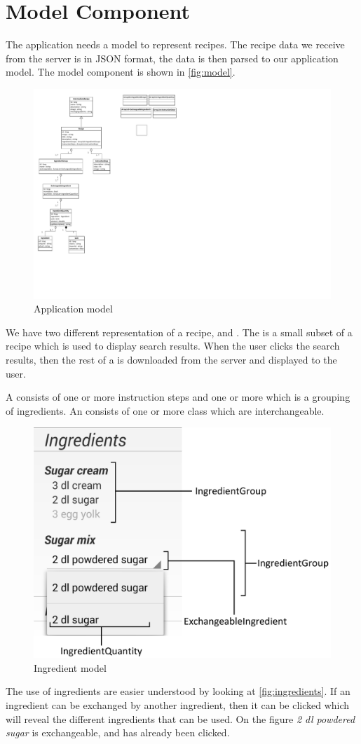 \pagebreak
\section{Model Component}

The application needs a model to represent recipes. The recipe data we receive from the server is in JSON format, the data is then parsed to our application model. The model component is shown in \autoref{fig:model}.

\begin{figure}[H]
\centering
\includegraphics[width=0.67\linewidth, page=2]{img/model.pdf}
\caption{Application model}
\label{fig:model}
\end{figure}

We have two different representation of a recipe,  and . The  is a small subset of a recipe which is used to display search results. When the user clicks the search results, then the rest of a  is downloaded from the server and displayed to the user.

A  consists of one or more instruction steps and one or more  which is a grouping of ingredients. An  consists of one or more  class which are interchangeable. 

\begin{figure}[H]
\centering
\includegraphics[width=0.6\linewidth]{img/ingredients.pdf}
\caption{Ingredient model}
\label{fig:ingredients}
\end{figure}
The use of ingredients are easier understood by looking at \autoref{fig:ingredients}. If an ingredient can be exchanged by another ingredient, then it can be clicked which will reveal the different ingredients that can be used. On the figure \textit{2 dl powdered sugar} is exchangeable, and has already been clicked.

